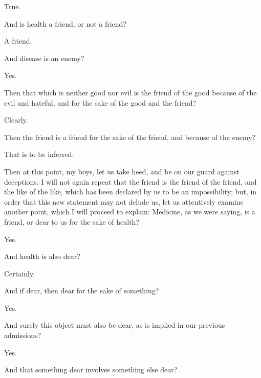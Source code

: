\documentclass[11pt,letter]{article}
\begin{document}
\par  True.

\par  And is health a friend, or not a friend?

\par  A friend.

\par  And disease is an enemy?

\par  Yes.

\par  Then that which is neither good nor evil is the friend of the good because of the evil and hateful, and for the sake of the good and the friend?

\par  Clearly.

\par  Then the friend is a friend for the sake of the friend, and because of the enemy?

\par  That is to be inferred.

\par  Then at this point, my boys, let us take heed, and be on our guard against deceptions. I will not again repeat that the friend is the friend of the friend, and the like of the like, which has been declared by us to be an impossibility; but, in order that this new statement may not delude us, let us attentively examine another point, which I will proceed to explain: Medicine, as we were saying, is a friend, or dear to us for the sake of health?

\par  Yes.

\par  And health is also dear?

\par  Certainly.

\par  And if dear, then dear for the sake of something?

\par  Yes.

\par  And surely this object must also be dear, as is implied in our previous admissions?

\par  Yes.

\par  And that something dear involves something else dear?
\end{document}

